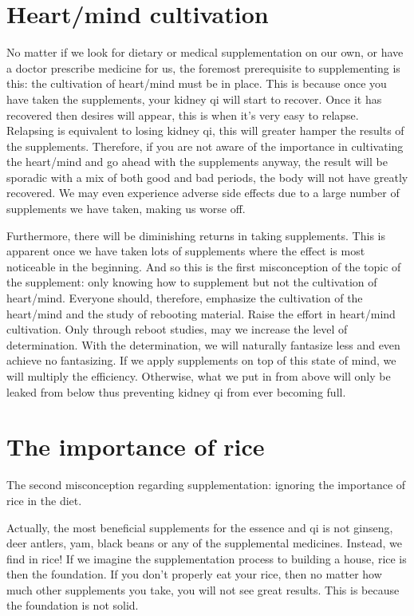 \documentclass[
]{book}
\begin{document}
\hypertarget{heartmind-cultivation}{%
\section{Heart/mind cultivation}\label{heartmind-cultivation}}

No matter if we look for dietary or medical supplementation on our own, or have a doctor prescribe medicine for us, the foremost prerequisite to supplementing is this: the cultivation of heart/mind must be in place. This is because once you have taken the supplements, your kidney qi will start to recover. Once it has recovered then desires will appear, this is when it's very easy to relapse. Relapsing is equivalent to losing kidney qi, this will greater hamper the results of the supplements. Therefore, if you are not aware of the importance in cultivating the heart/mind and go ahead with the supplements anyway, the result will be sporadic with a mix of both good and bad periods, the body will not have greatly recovered. We may even experience adverse side effects due to a large number of supplements we have taken, making us worse off.

Furthermore, there will be diminishing returns in taking supplements. This is apparent once we have taken lots of supplements where the effect is most noticeable in the beginning. And so this is the first misconception of the topic of the supplement: only knowing how to supplement but not the cultivation of heart/mind. Everyone should, therefore, emphasize the cultivation of the heart/mind and the study of rebooting material. Raise the effort in heart/mind cultivation. Only through reboot studies, may we increase the level of determination. With the determination, we will naturally fantasize less and even achieve no fantasizing. If we apply supplements on top of this state of mind, we will multiply the efficiency. Otherwise, what we put in from above will only be leaked from below thus preventing kidney qi from ever becoming full.

\hypertarget{the-importance-of-rice}{%
\section{The importance of rice}\label{the-importance-of-rice}}

The second misconception regarding supplementation: ignoring the importance of rice in the diet.

Actually, the most beneficial supplements for the essence and qi is not ginseng, deer antlers, yam, black beans or any of the supplemental medicines. Instead, we find in rice! If we imagine the supplementation process to building a house, rice is then the foundation. If you don't properly eat your rice, then no matter how much other supplements you take, you will not see great results. This is because the foundation is not solid.
\end{document}
